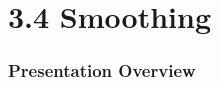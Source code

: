 \documentclass[13.5pt,aspecratio=169]{beamer}
\begin{document}

\section{3.4 Smoothing} %
\begin{frame}
	\frametitle{Presentation Overview} %
	\tableofcontents[currentsection]
\end{frame}

\end{document}
